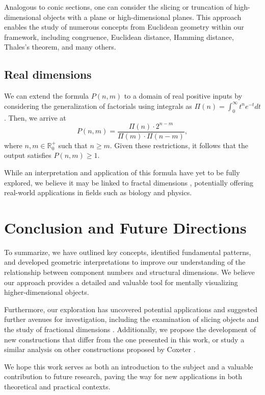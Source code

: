 \documentclass{article}
\begin{document}
	Analogous to conic sections, one can consider the slicing or truncation of high-dimensional objects \cite{coxeter1973regular} with a plane or high-dimensional planes. This approach enables the study of numerous concepts from Euclidean geometry \cite{euclid} within our framework, including congruence, Euclidean distance, Hamming distance, Thales's theorem, and many others.
	
	
	\subsection{Real dimensions}
	
	We can extend the formula $P(n,m)$ to a domain of real positive inputs by considering the generalization of factorials using integrals as $\Pi(n)=\int_{0}^{\infty} t^n e^{-t} dt$ \cite{rice2007}. Then, we arrive at $$P(n,m)=\frac{\Pi(n) \cdot 2^{n-m}}{\Pi(m) \cdot \Pi(n-m)},$$
	where $n,m \in \mathbb{R}^{+}_{0}$ such that $n\geq m$. Given these restrictions, it follows that the output satisfies $P(n,m) \geq 1$. 
	
	While an interpretation and application of this formula have yet to be fully explored, we believe it may be linked to fractal dimensions \cite{fractionalDim}, potentially offering real-world applications in fields such as biology and physics.
	
	\section{Conclusion and Future Directions \label{sec:conclusion}}
	
	To summarize, we have outlined key concepts, identified fundamental patterns, and developed geometric interpretations to improve our understanding of the relationship between component numbers and structural dimensions. We believe our approach provides a detailed and valuable tool for mentally visualizing higher-dimensional objects.
	
	Furthermore, our exploration has uncovered potential applications and suggested further avenues for investigation, including the examination of slicing objects and the study of fractional dimensions \cite{fractionalDim}. Additionally, we propose the development of new constructions that differ from the one presented in this work, or study a similar analysis on other constructions proposed by Coxeter \cite{coxeter1973regular}.
	
	We hope this work serves as both an introduction to the subject and a valuable contribution to future research, paving the way for new applications in both theoretical and practical contexts.
	
\end{document}
